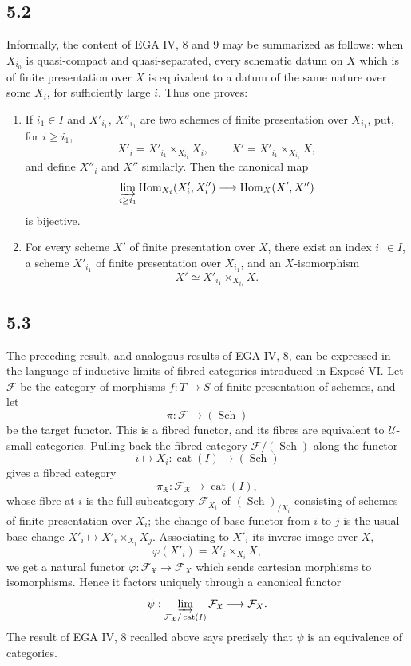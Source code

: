 \documentclass[11pt]{article}
\newcommand{\U}{\mathcal{U}}
\newcommand{\Ff}{\mathcal{F}}
\newcommand{\Sch}{\operatorname{Sch}}
\newcommand{\Hom}{\operatorname{Hom}}
\newcommand{\EGA}{EGA}
\begin{document}
\subsection*{5.2}
Informally, the content of \EGA{} IV, 8 and 9 may be summarized as follows: when \(X_{i_0}\) is quasi-compact and quasi-separated, every schematic datum on \(X\) which is of finite presentation over \(X\) is equivalent to a datum of the same nature over some \(X_i\), for sufficiently large \(i\). Thus one proves:

\begin{enumerate}[label=(\alph*)]
\item If \(i_1\in I\) and \(X'_{i_1}\), \(X''_{i_1}\) are two schemes of finite presentation over \(X_{i_1}\), put, for \(i\ge i_1\),
\[
X'_i=X'_{i_1}\times_{X_{i_1}}X_i,
\qquad
X'=X'_{i_1}\times_{X_{i_1}}X,
\]
and define \(X''_i\) and \(X''\) similarly. Then the canonical map
\[
\varinjlim_{i\ge i_1}\Hom_{X_i}(X'_i,X''_i)\longrightarrow \Hom_X(X',X'')
\]
is bijective.
\item For every scheme \(X'\) of finite presentation over \(X\), there exist an index \(i_1\in I\), a scheme \(X'_{i_1}\) of finite presentation over \(X_{i_1}\), and an \(X\)-isomorphism
\[
X'\simeq X'_{i_1}\times_{X_{i_1}}X.
\]
\end{enumerate}

\subsection*{5.3}
The preceding result, and analogous results of \EGA{} IV, 8, can be expressed in the language of inductive limits of fibred categories introduced in Expos\'e VI. Let \(\Ff\) be the category of morphisms \(f:T\to S\) of finite presentation of schemes, and let
\[
\pi:\Ff\longrightarrow (\Sch)
\]
be the target functor. This is a fibred functor, and its fibres are equivalent to \(\U\)-small categories. Pulling back the fibred category \(\Ff/(\Sch)\) along the functor
\[
i\longmapsto X_i:\operatorname{cat}(I)\longrightarrow(\Sch)
\]
gives a fibred category
\[
\pi_{\mathfrak X}:\Ff_{\mathfrak X}\longrightarrow \operatorname{cat}(I),
\]
whose fibre at \(i\) is the full subcategory \(\Ff_{X_i}\) of \((\Sch)_{/X_i}\) consisting of schemes of finite presentation over \(X_i\); the change-of-base functor from \(i\) to \(j\) is the usual base change \(X'_i\mapsto X'_i\times_{X_i}X_j\). Associating to \(X'_i\) its inverse image over \(X\),
\[
\varphi(X'_i)=X'_i\times_{X_i}X,
\]
we get a natural functor \(\varphi:\Ff_{\mathfrak X}\to\Ff_X\) which sends cartesian morphisms to isomorphisms. Hence it factors uniquely through a canonical functor
\[
\psi:\varinjlim_{\Ff_{\mathfrak X}/\operatorname{cat}(I)} \Ff_{\mathfrak X}
\longrightarrow \Ff_X.
\]
The result of \EGA{} IV, 8 recalled above says precisely that \(\psi\) is an equivalence of categories.
\end{document}
